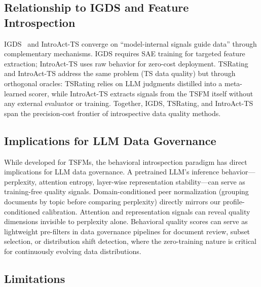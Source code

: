 \documentclass{article}
\begin{document}
\subsection{Relationship to IGDS and Feature Introspection}

IGDS~\citep{shi2026igds} and IntroAct-TS converge on ``model-internal signals guide data'' through complementary mechanisms. IGDS requires SAE training for targeted feature extraction; IntroAct-TS uses raw behavior for zero-cost deployment. TSRating~\citep{chen2026tsrating} and IntroAct-TS address the same problem (TS data quality) but through orthogonal oracles: TSRating relies on LLM judgments distilled into a meta-learned scorer, while IntroAct-TS extracts signals from the TSFM itself without any external evaluator or training. Together, IGDS, TSRating, and IntroAct-TS span the precision-cost frontier of introspective data quality methods.

\subsection{Implications for LLM Data Governance}

While developed for TSFMs, the behavioral introspection paradigm has direct implications for LLM data governance. A pretrained LLM's inference behavior---perplexity, attention entropy, layer-wise representation stability---can serve as training-free quality signals. Domain-conditioned peer normalization (grouping documents by topic before comparing perplexity) directly mirrors our profile-conditioned calibration. Attention and representation signals can reveal quality dimensions invisible to perplexity alone. Behavioral quality scores can serve as lightweight pre-filters in data governance pipelines for document review, subset selection, or distribution shift detection, where the zero-training nature is critical for continuously evolving data distributions.

\subsection{Limitations}
\label{sec:limitations}
\end{document}

